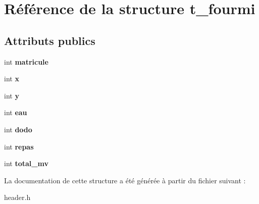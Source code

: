 \hypertarget{structt__fourmi}{\section{Référence de la structure t\+\_\+fourmi}
\label{structt__fourmi}
}
\subsection*{Attributs publics}
\begin{DoxyCompactItemize}
\item 
\hypertarget{structt__fourmi_ab45e723a7a11d7789888a5ee574c6bc9}{int {\bfseries matricule}}\label{structt__fourmi_ab45e723a7a11d7789888a5ee574c6bc9}

\item 
\hypertarget{structt__fourmi_a258cf4f2243aad27ab01dc55bb701078}{int {\bfseries x}}\label{structt__fourmi_a258cf4f2243aad27ab01dc55bb701078}

\item 
\hypertarget{structt__fourmi_aa9fe73b8d3d492ce6cf3985e4910fdf2}{int {\bfseries y}}\label{structt__fourmi_aa9fe73b8d3d492ce6cf3985e4910fdf2}

\item 
\hypertarget{structt__fourmi_a757c3ee4ea2dcbf825cd93f6b8bf0ef8}{int {\bfseries eau}}\label{structt__fourmi_a757c3ee4ea2dcbf825cd93f6b8bf0ef8}

\item 
\hypertarget{structt__fourmi_a0a2a75c5a649f263d4e299a488edfe4f}{int {\bfseries dodo}}\label{structt__fourmi_a0a2a75c5a649f263d4e299a488edfe4f}

\item 
\hypertarget{structt__fourmi_a5ba7caca7f8cf1e8195ceae92cdaca00}{int {\bfseries repas}}\label{structt__fourmi_a5ba7caca7f8cf1e8195ceae92cdaca00}

\item 
\hypertarget{structt__fourmi_a81345593813fffd4760b20bc55392190}{int {\bfseries total\+\_\+mv}}\label{structt__fourmi_a81345593813fffd4760b20bc55392190}

\end{DoxyCompactItemize}


La documentation de cette structure a été générée à partir du fichier suivant \+:\begin{DoxyCompactItemize}
\item 
header.\+h\end{DoxyCompactItemize}
